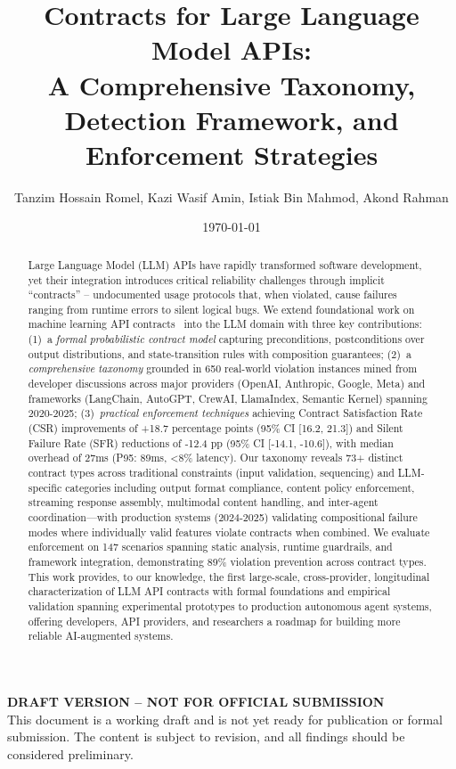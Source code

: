 \documentclass[11pt]{article}
\begin{document}
\title{Contracts for Large Language Model APIs: \\ A Comprehensive Taxonomy, Detection Framework, and Enforcement Strategies}

\author{Tanzim Hossain Romel, Kazi Wasif Amin, Istiak Bin Mahmod, Akond Rahman\\}

\date{\today}
\maketitle

\noindent
\colorbox{yellow!30}{%
\parbox{\dimexpr\textwidth-2\fboxsep\relax}{%
\textbf{\large DRAFT VERSION -- NOT FOR OFFICIAL SUBMISSION}\\[0.5em]
This document is a working draft and is not yet ready for publication or formal submission. The content is subject to revision, and all findings should be considered preliminary.
}%
}

\vspace{1em}

\begin{abstract}
Large Language Model (LLM) APIs have rapidly transformed software development, yet their integration introduces critical reliability challenges through implicit ``contracts'' -- undocumented usage protocols that, when violated, cause failures ranging from runtime errors to silent logical bugs. We extend foundational work on machine learning API contracts~\cite{khairunnesa2023} into the LLM domain with three key contributions: (1)~a \textit{formal probabilistic contract model} capturing preconditions, postconditions over output distributions, and state-transition rules with composition guarantees; (2)~a \textit{comprehensive taxonomy} grounded in 650 real-world violation instances mined from developer discussions across major providers (OpenAI, Anthropic, Google, Meta) and frameworks (LangChain, AutoGPT, CrewAI, LlamaIndex, Semantic Kernel) spanning 2020-2025; (3)~\textit{practical enforcement techniques} achieving Contract Satisfaction Rate (CSR) improvements of +18.7 percentage points (95\% CI [16.2, 21.3]) and Silent Failure Rate (SFR) reductions of -12.4 pp (95\% CI [-14.1, -10.6]), with median overhead of 27ms (P95: 89ms, <8\% latency). Our taxonomy reveals 73+ distinct contract types across traditional constraints (input validation, sequencing) and LLM-specific categories including output format compliance, content policy enforcement, streaming response assembly, multimodal content handling, and inter-agent coordination—with production systems (2024-2025) validating compositional failure modes where individually valid features violate contracts when combined. We evaluate enforcement on 147 scenarios spanning static analysis, runtime guardrails, and framework integration, demonstrating 89\% violation prevention across contract types. This work provides, to our knowledge, the first large-scale, cross-provider, longitudinal characterization of LLM API contracts with formal foundations and empirical validation spanning experimental prototypes to production autonomous agent systems, offering developers, API providers, and researchers a roadmap for building more reliable AI-augmented systems.
\end{abstract}
\end{document}
